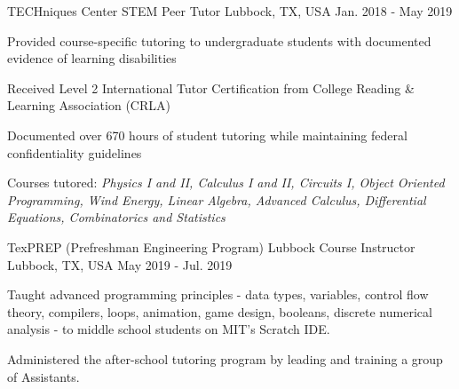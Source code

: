 \begin{cventries}
    \cventry
    {TECHniques Center}
    {STEM Peer Tutor}
    {Lubbock, TX, USA}
    {Jan. 2018 - May 2019}
    {
        \begin{cvitems}
        \item{Provided course-specific tutoring to undergraduate students with documented evidence of learning disabilities}
        \item{Received Level 2 International Tutor Certification from College Reading \& Learning Association (CRLA)}
        \item{Documented over 670 hours of student tutoring while maintaining federal confidentiality guidelines}
        \item{Courses tutored: \textit{Physics I and II, Calculus I and II, Circuits I, Object Oriented Programming, Wind Energy, Linear Algebra, Advanced Calculus, Differential Equations, Combinatorics and Statistics}}
        \end{cvitems}
        \vspace{1em}
    }

    \cventry
    {TexPREP (Prefreshman Engineering Program) Lubbock}
    {Course Instructor}
    {Lubbock, TX, USA}
    {May 2019 - Jul. 2019}
    {
        \begin{cvitems}
        \item{Taught advanced programming principles - data types, variables, control flow theory, compilers, loops, animation, game design, booleans, discrete numerical analysis - to middle school students on MIT’s Scratch IDE.}
        \item{Administered the after-school tutoring program by leading and training a group of Assistants.}
        \end{cvitems}
        \vspace{1em}
    }

\end{cventries}
